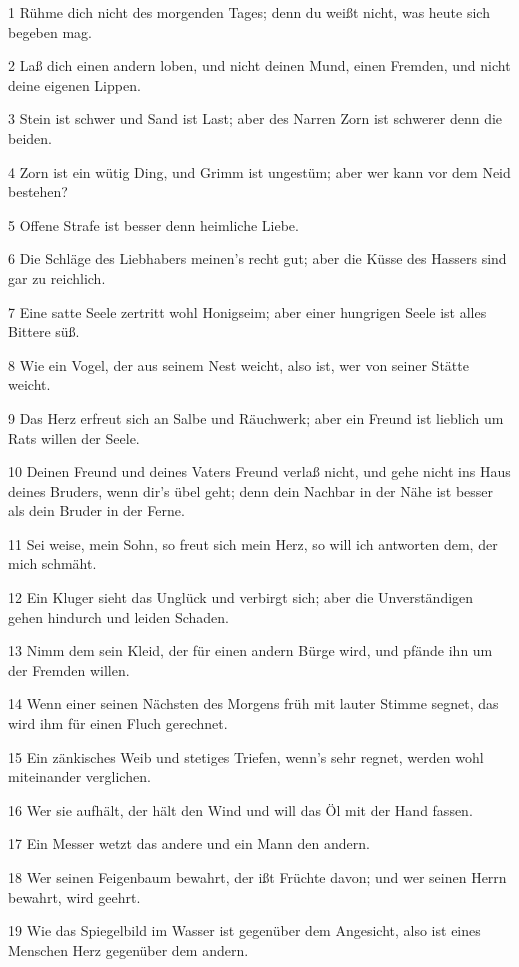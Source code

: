 \par 1 Rühme dich nicht des morgenden Tages; denn du weißt nicht, was heute sich begeben mag.
\par 2 Laß dich einen andern loben, und nicht deinen Mund, einen Fremden, und nicht deine eigenen Lippen.
\par 3 Stein ist schwer und Sand ist Last; aber des Narren Zorn ist schwerer denn die beiden.
\par 4 Zorn ist ein wütig Ding, und Grimm ist ungestüm; aber wer kann vor dem Neid bestehen?
\par 5 Offene Strafe ist besser denn heimliche Liebe.
\par 6 Die Schläge des Liebhabers meinen's recht gut; aber die Küsse des Hassers sind gar zu reichlich.
\par 7 Eine satte Seele zertritt wohl Honigseim; aber einer hungrigen Seele ist alles Bittere süß.
\par 8 Wie ein Vogel, der aus seinem Nest weicht, also ist, wer von seiner Stätte weicht.
\par 9 Das Herz erfreut sich an Salbe und Räuchwerk; aber ein Freund ist lieblich um Rats willen der Seele.
\par 10 Deinen Freund und deines Vaters Freund verlaß nicht, und gehe nicht ins Haus deines Bruders, wenn dir's übel geht; denn dein Nachbar in der Nähe ist besser als dein Bruder in der Ferne.
\par 11 Sei weise, mein Sohn, so freut sich mein Herz, so will ich antworten dem, der mich schmäht.
\par 12 Ein Kluger sieht das Unglück und verbirgt sich; aber die Unverständigen gehen hindurch und leiden Schaden.
\par 13 Nimm dem sein Kleid, der für einen andern Bürge wird, und pfände ihn um der Fremden willen.
\par 14 Wenn einer seinen Nächsten des Morgens früh mit lauter Stimme segnet, das wird ihm für einen Fluch gerechnet.
\par 15 Ein zänkisches Weib und stetiges Triefen, wenn's sehr regnet, werden wohl miteinander verglichen.
\par 16 Wer sie aufhält, der hält den Wind und will das Öl mit der Hand fassen.
\par 17 Ein Messer wetzt das andere und ein Mann den andern.
\par 18 Wer seinen Feigenbaum bewahrt, der ißt Früchte davon; und wer seinen Herrn bewahrt, wird geehrt.
\par 19 Wie das Spiegelbild im Wasser ist gegenüber dem Angesicht, also ist eines Menschen Herz gegenüber dem andern.
